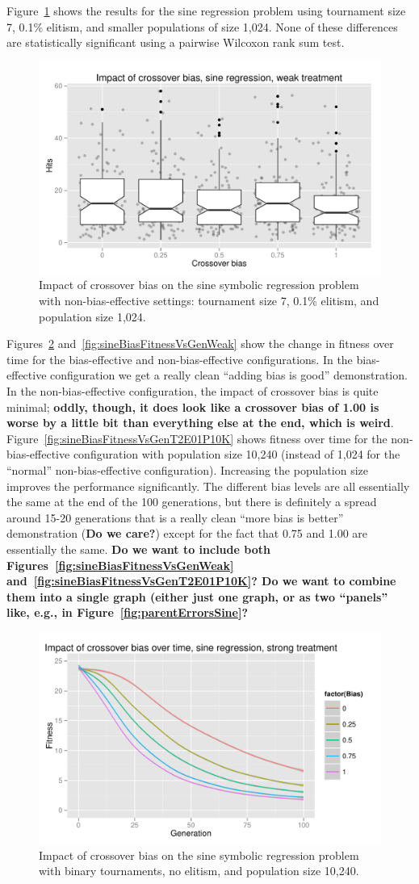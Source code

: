 \documentclass{sig-alternate}
\begin{document}
Figure~\ref{fig:sineBiasResultsWeak} shows the results for the sine regression problem using tournament size 7, 0.1\%
elitism, and smaller populations  of size 1,024. None of these differences are statistically significant using a
pairwise Wilcoxon rank sum test.

\begin{figure}
\centering
\includegraphics[width=0.45 \textwidth]{Plots/Sine_XO_impact_weak_boxplot.pdf}
\caption{Impact of crossover bias on the sine symbolic regression problem with non-bias-effective settings: tournament
size 7, 0.1\% elitism, and population size 1,024.}
\label{fig:sineBiasResultsWeak}
\end{figure}

Figures~\ref{fig:sineBiasFitnessVsGenStrong} and~\ref{fig:sineBiasFitnessVsGenWeak} show the change in fitness over
time for the bias-effective and non-bias-effective configurations. In the bias-effective configuration we get a really
clean ``adding bias is good'' demonstration. In the non-bias-effective configuration, the impact of crossover bias is
quite minimal; \textbf{oddly, though, it does look like a crossover bias of 1.00 is worse by a little bit than
everything else at the end, which is weird}. Figure~\ref{fig:sineBiasFitnessVsGenT2E01P10K} shows fitness over time for
the non-bias-effective configuration with population size 10,240 (instead of 1,024 for the ``normal'' non-bias-effective
configuration). Increasing the population size improves the performance significantly. The different bias levels are
all essentially the same at the end of the 100 generations, but there is definitely a spread around 15-20 generations
that is a really clean ``more bias is better'' demonstration (\textbf{Do we care?}) except for the fact that 0.75 and
1.00 are essentially the same. \textbf{Do we want to include both Figures~\ref{fig:sineBiasFitnessVsGenWeak}
and~\ref{fig:sineBiasFitnessVsGenT2E01P10K}? Do we want to combine them into a single graph (either just one graph, or
as two ``panels'' like, e.g., in Figure~\ref{fig:parentErrorsSine}?}

\begin{figure}
\centering
\includegraphics[width=0.45 \textwidth]{Plots/Sine_XO_fitness_vs_gen_strong.pdf}
\caption{Impact of crossover bias on the sine symbolic regression problem with binary tournaments, no elitism, and 
population size 10,240.}
\label{fig:sineBiasFitnessVsGenStrong}
\end{figure}
\end{document}
